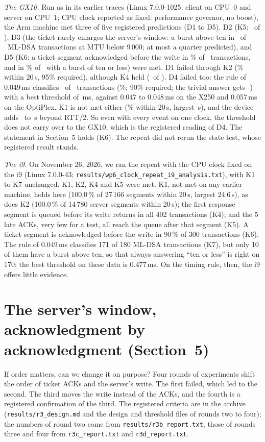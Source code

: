\documentclass[9pt]{article}
\newcommand{\ms}{\,ms\xspace}
\begin{document}
\emph{The GX10.} Run as in its earlier traces (Linux 7.0.0-1025; client on CPU~0 and server on CPU~1; CPU clock reported as fixed: performance governor, no boost), the Arm machine met three of five registered predictions (D1 to D5). D2 (K5: \RgKFiveRight\ of \RgKFiveN), D3 (the ticket rarely enlarges the server's window: a burst above ten in \RgKSevenPos\ of \RgKSevenN\ ML-DSA transactions at MTU below 9\,000; at most a quarter predicted), and D5 (K6: a ticket segment acknowledged before the write in \RgKSixPct\% of \RgKSixN\ transactions, and in \RgKSixSmallPct\% of \RgKSixSmallN\ with a burst of ten or less) were met. D1 failed through K2 (\RgKTwoPct\% within 20\,\textmu s, 95\% required), although K4 held (\RgKFourRight\ of \RgKFourN). D4 failed too: the rule of 0.049\ms classifies \RgKSevenRight\ of \RgKSevenN\ transactions (\RgKSevenPct\%; 90\% required; the trivial answer gets \the\numexpr\RgKSevenN-\RgKSevenPos\relax) with a best threshold of \RgKSevenBestLo\ms, against 0.047 to 0.048\ms on the X250 and 0.057\ms on the OptiPlex. K1 is not met either (\RgKOnePct\% within 20\,\textmu s, largest \RgKOneMax\,\textmu s), and the device adds \RgKThreeLo\ to \RgKThreeHi\,\textmu s beyond RTT/2. So even with every event on one clock, the threshold does not carry over to the GX10, which is the registered reading of D4. The statement in Section~5 holds (K6). The repeat did not rerun the state test, whose registered result stands.

\emph{The i9.} On November 26, 2026, we ran the repeat with the CPU clock fixed on the i9 (Linux 7.0.0-43; \texttt{results/wp6\_clock\_repeat\_i9\_analysis.txt}), with K1 to K7 unchanged. K1, K2, K4 and K5 were met. K1, not met on any earlier machine, holds here (100.0\,\% of 27\,166 segments within 20\,\textmu s, largest 24.6\,\textmu s), as does K2 (100.0\,\% of 14\,780 server segments within 20\,\textmu s); the first response segment is queued before its write returns in all 402 transactions (K4); and the 5 late ACKs, very few for a test, all reach the queue after that segment (K5). A ticket segment is acknowledged before the write in 90\,\% of 300 transactions (K6). The rule of 0.049\ms classifies 171 of 180 ML-DSA transactions (K7), but only 10 of them have a burst above ten, so that always answering ``ten or less'' is right on 170; the best threshold on these data is 0.477\ms. On the timing rule, then, the i9 offers little evidence.

\section*{The server's window, acknowledgment by acknowledgment (Section~5)}
If order matters, can we change it on purpose? Four rounds of experiments shift the order of ticket ACKs and the server's write. The first failed, which led to the second. The third moves the write instead of the ACKs, and the fourth is a registered confirmation of the third. The registered criteria are in the archive (\texttt{results/r3\_design.md} and the design and threshold files of rounds two to four); the numbers of round two come from \texttt{results/r3b\_report.txt}, those of rounds three and four from \texttt{r3c\_report.txt} and \texttt{r3d\_report.txt}.
\end{document}
